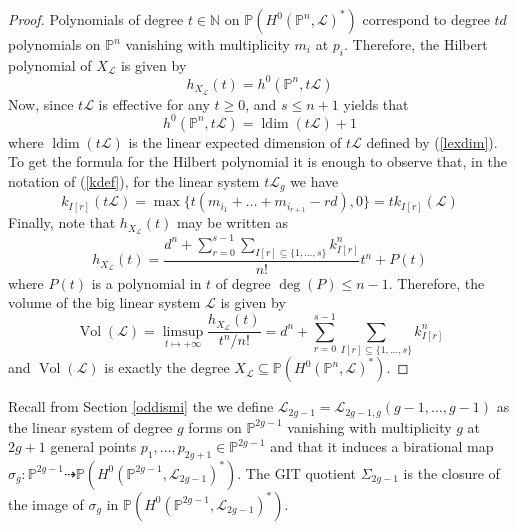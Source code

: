 \documentclass[a4paper,10pt]{amsart}
\theoremstyle{definition}
\DeclareMathOperator{\ldim}{ldim}
\DeclareMathOperator{\Vol}{Vol}
\begin{document}
\begin{proof}
Polynomials of degree $t\in\mathbb{N}$ on $\mathbb{P}(H^0(\mathbb{P}^{n},\mathcal{L})^{*})$ correspond to degree $td$ polynomials on $\mathbb{P}^{n}$ vanishing with multiplicity $m_i$ at $p_i$. Therefore, the Hilbert polynomial of $X_{\mathcal{L}}$ is given by 
$$h_{X_{\mathcal{L}}}(t) = h^0(\mathbb{P}^{n},t\mathcal{L})$$
Now, since $t\mathcal{L}$ is effective for any $t\geq 0$, and $s \leq n+1$ \cite[Theorem 4.6]{BDP16} yields that 
$$h^0(\mathbb{P}^{n},t\mathcal{L}) = \ldim(t\mathcal{L})+1$$
where $\ldim(t\mathcal{L})$ is the linear expected dimension of $t\mathcal{L}$ defined by (\ref{lexdim}). To get the formula for the Hilbert polynomial it is enough to observe that, in the notation of (\ref{kdef}), for the linear system $t\mathcal{L}_g$ we have 
$$k_{I[r]}(t\mathcal{L}) = \max\{t(m_{i_1}+\dots+m_{i_{r+1}}-rd),0\}= tk_{I[r]}(\mathcal{L})$$
Finally, note that $h_{X_{\mathcal{L}}}(t)$ may be written as
$$h_{X_{\mathcal{L}}}(t) = \frac{d^n+\sum_{r=0}^{s-1}\sum_{I[r]\subseteq\{1,\dots,s\}}k_{I[r]}^n}{n!}t^{n}+P(t)$$
where $P(t)$ is a polynomial in $t$ of degree $\deg(P)\leq n-1$. Therefore, the volume of the big linear system $\mathcal{L}$ is given by
$$\Vol(\mathcal{L}) = \limsup_{t\mapsto +\infty}\frac{h_{X_{\mathcal{L}}}(t)}{t^{n}/n!}= d^n+\sum_{r=0}^{s-1}\sum_{I[r]\subseteq\{1,\dots,s\}}k_{I[r]}^n$$
and $\Vol(\mathcal{L})$ is exactly the degree $X_{\mathcal{L}}\subseteq\mathbb{P}(H^0(\mathbb{P}^{n},\mathcal{L})^{*})$.
\end{proof}

Recall from Section \ref{oddismi} the we define $\mathcal{L}_{2g-1} = \mathcal{L}_{2g-1,g}(g-1,\dots,g-1)$ as the linear system of degree $g$ forms on $\mathbb{P}^{2g-1}$ vanishing with multiplicity $g$ at $2g+1$ general points $p_{1},\dots,p_{2g+1}\in\mathbb{P}^{2g-1}$ and that it induces a birational map $\sigma_g:\mathbb{P}^{2g-1}\dasharrow\mathbb{P}(H^0(\mathbb{P}^{2g-1},\mathcal{L}_{2g-1})^{*}).$ The GIT quotient $\Sigma_{2g-1}$ is the closure of the image of $\sigma_g$ in $\mathbb{P}(H^0(\mathbb{P}^{2g-1},\mathcal{L}_{2g-1})^{*})$. 
\end{document}
